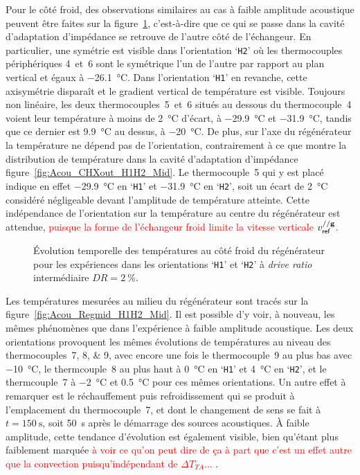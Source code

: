 Pour le côté froid, des observations similaires au cas à faible amplitude acoustique peuvent être faites sur la figure~\ref{fig:Acou_CHXin_H1H2_Mid}, c'est-à-dire que ce qui se passe dans la cavité d'adaptation d'impédance se retrouve de l'autre côté de l'échangeur. En particulier, une symétrie est visible dans l'orientation `\texttt{H2}' où les thermocouples périphériques 4~et~6 sont le symétrique l'un de l'autre par rapport au plan vertical et égaux à \qty{-26.1}{\degreeCelsius}. Dans l'orientation `\texttt{H1}' en revanche, cette axisymétrie disparaît et le gradient vertical de température est visible. Toujours non linéaire, les deux thermocouples~5~et~6 situés au dessous du thermocouple~4 voient leur température à moins de \qty{2}{\degreeCelsius} d'écart, à \qty{-29.9}{\degreeCelsius} et \qty{-31.9}{\degreeCelsius}, tandis que ce dernier est \qty{9.9}{\degreeCelsius} au dessus, à \qty{-20}{\degreeCelsius}.
De plus, sur l'axe du régénérateur la température ne dépend pas de l'orientation, contrairement à ce que montre la distribution de température dans la cavité d'adaptation d'impédance figure~\ref{fig:Acou_CHXout_H1H2_Mid}. Le thermocouple~5 qui y est placé indique en effet \qty{-29,9}{\degreeCelsius} en `\texttt{H1}' et \qty{-31.9}{\degreeCelsius} en `\texttt{H2}', soit un écart de \qty{2}{\degreeCelsius} considéré négligeable devant l'amplitude de température atteinte. Cette indépendance de l'orientation sur la température au centre du régénérateur est attendue, \textcolor{red}{puisque la forme de l'échangeur froid limite la vitesse verticale $v_{\sf ref}^{// \mathbf g}$.}

\begin{figure}[!ht]
    \centering
    
    \caption{\'Evolution temporelle des températures au côté froid du régénérateur pour les expériences dans les orientations `\texttt{H1}' et `\texttt{H2}' à \textit{drive ratio} intermédiaire $DR=\qty{2}{\percent}$.}
    \label{fig:Acou_CHXin_H1H2_Mid}
\end{figure}

Les températures mesurées au milieu du régénérateur sont tracés sur la figure~\ref{fig:Acou_Regmid_H1H2_Mid}. Il est possible d'y voir, à nouveau, les mêmes phénomènes que dans l'expérience à faible amplitude acoustique. Les deux orientations provoquent les mêmes évolutions de températures au niveau des thermocouples~\numlist{7;8;9}, avec encore une fois le thermocouple~9 au plus bas avec \qty{-10}{\degreeCelsius}, le thermcouple~8 au plus haut à \qty{0}{\degreeCelsius} en `\texttt{H1}' et \qty{4}{\degreeCelsius} en `\texttt{H2}', et le thermcouple~7 à \qty{-2}{\degreeCelsius} et \qty{.5}{\degreeCelsius} pour ces mêmes orientations. Un autre effet à remarquer est le réchauffement puis refroidissement qui se produit à l'emplacement du thermocouple~7, et dont le changement de sens se fait à $t=\qty{150}{\second}$, soit \qty{50}{\second} après le démarrage des sources acoustiques. À faible amplitude, cette tendance d'évolution est également visible, bien qu'étant plus faiblement marquée \textcolor{red}{à voir ce qu'on peut dire de ça à part que c'est un effet autre que la convection puisqu'indépendant de $\Delta T_{TA}$... }. 

